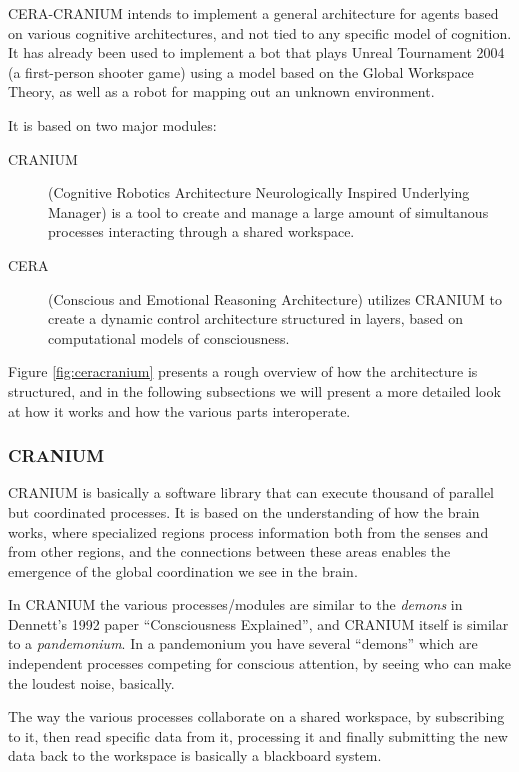 CERA-CRANIUM intends to implement a general architecture for agents based on
various cognitive architectures, and not tied to any specific model of
cognition. It has already been used to implement a bot that plays Unreal
Tournament 2004 (a first-person shooter game) using a model based on the Global
Workspace Theory, as well as a robot for mapping out an unknown environment.
\cite{arrabales2009ceracranium}

It is based on two major modules:
\begin{description}
 \item [CRANIUM] (Cognitive Robotics Architecture Neurologically Inspired
Underlying Manager) is a tool to create and manage a large amount of
simultanous processes interacting through a shared workspace.
 \item [CERA] (Conscious and Emotional Reasoning Architecture)
 utilizes CRANIUM to create a dynamic control architecture structured in
layers, based on computational models of consciousness.
\end{description}

Figure \ref{fig:ceracranium} presents a rough overview of how the architecture
is structured, and in the following subsections we will present a more
detailed look at how it works and how the various parts interoperate.

\subsubsection{CRANIUM}
CRANIUM is basically a software library that can execute thousand of parallel
but coordinated processes.
It is based on the understanding of how the brain works, where specialized
regions process information both from the senses and from other regions, and
the connections between these areas enables the emergence of the global
coordination we see in the brain.\cite{baars2005gwt}

In CRANIUM the various processes/modules are similar to the \textit{demons} in
Dennett's 1992 paper ``Consciousness Explained'', and CRANIUM itself is similar
to a \textit{pandemonium}.\cite{dennet1992consciousness} In a pandemonium you
have several ``demons'' which are independent processes competing for conscious
attention, by seeing who can make the loudest noise, basically.

The way the various processes collaborate on a shared workspace, by subscribing
to it, then read specific data from it, processing it and finally submitting the
new data back to the workspace is basically a blackboard
system.\cite{nii1986blackboard}

